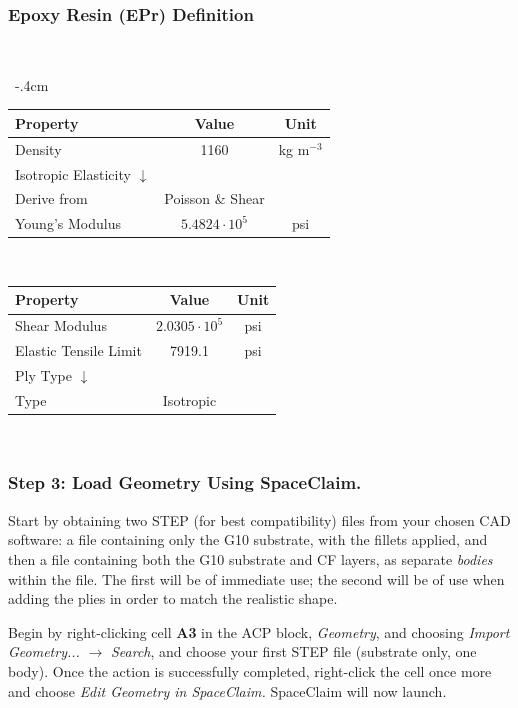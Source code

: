\documentclass{amsdtx}
\begin{document}
\subsubsection{Epoxy Resin (EPr) Definition}
~\\[-3em]
\begin{table}[H]
\centering
\renewcommand{\arraystretch}{1.4}
~\kern-.4cm\begin{tabular}{l|c|c}
\bf Property & \bf Value & \bf Unit \\\hline\hline
Density & 1160 & kg m$^{-3}$ \\\hline
Isotropic Elasticity $\downarrow$ & & \\\hline
\quad Derive from & Poisson \& Shear & \\\hline
\quad Young's Modulus & $5.4824\cdot 10^5$ & psi \\\hline
\end{tabular}~~~~~~
\begin{tabular}{l|c|c}
\bf Property & \bf Value & \bf Unit \\\hline\hline
\quad Shear Modulus & $2.0305\cdot 10^5$ & psi\\\hline
Elastic Tensile Limit & 7919.1 & psi \\\hline
Ply Type $\downarrow$ &  &\\\hline
\quad Type & Isotropic & \\\hline
\end{tabular}
\end{table}
~\\\subsubsection{Step 3: Load Geometry Using SpaceClaim.}
Start by obtaining two STEP (for best compatibility) files from your chosen CAD software: a file containing only the G10 substrate, with the fillets applied, and then a file containing both the G10 substrate and CF layers, as separate \textit{bodies} within the file. The first will be of immediate use; the second will be of use when adding the plies in order to match the realistic shape.

Begin by right-clicking cell {\bf A3} in the ACP block, \textit{Geometry}, and choosing \textit{Import Geometry...} $\rightarrow$ \textit{Search}, and choose your first STEP file (substrate only, one body). Once the action is successfully completed, right-click the cell once more and choose \textit{Edit Geometry in SpaceClaim.} SpaceClaim will now launch.
\end{document}
